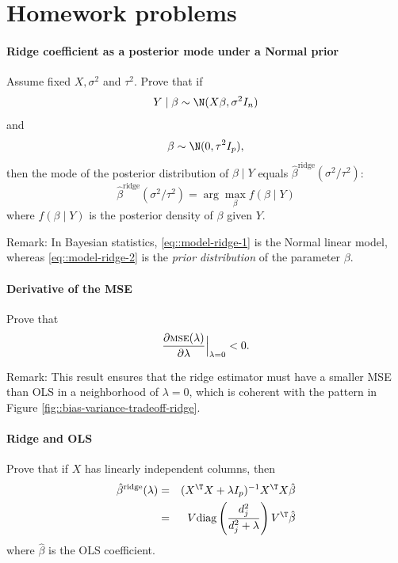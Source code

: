  


\section{Homework problems}

\paragraph{Ridge coefficient as a posterior mode under a Normal prior}\label{hw13::ridge-bayes}

Assume fixed $X, \sigma^2$ and $\tau^2$. 
Prove that if
\begin{equation}
\label{eq::model-ridge-1}
Y \mid \beta \sim\N(X\beta,\sigma^{2} I_n )
\end{equation}
and
\begin{equation}
\label{eq::model-ridge-2}
\beta\sim\N(0,\tau^{2}I_{p}),
\end{equation}
then the mode of the posterior distribution of $\beta\mid Y$ equals $\hat{\beta}^{\text{ridge}}(\sigma^{2}/\tau^{2})$:
$$
\hat{\beta}^{\text{ridge}}(\sigma^{2}/\tau^{2}) = \arg \max_{\beta} f(  \beta\mid Y  )
$$
where $f(\beta\mid Y)$ is the posterior density of $\beta$ given $Y$. 


Remark: In Bayesian statistics, \eqref{eq::model-ridge-1} is the Normal linear model, whereas \eqref{eq::model-ridge-2} is the {\it prior distribution} of the parameter $\beta$. 




\paragraph{Derivative of the MSE}\label{hw13::derivative-of-mse}

Prove that 
$$
\frac{\partial\textsc{mse}(\lambda)}{\partial\lambda} \Big |_{\lambda = 0} <0 .
$$

Remark: This result ensures that the ridge estimator must have a smaller MSE than OLS in a neighborhood of $\lambda = 0$, which is coherent with the pattern in Figure \ref{fig::bias-variance-tradeoff-ridge}. 



\paragraph{Ridge and OLS}\label{hw13::ridge-ols}


Prove that if  $X$ has linearly independent columns, then
\begin{eqnarray*}
\hat{\beta}^{\text{ridge}}(\lambda) 
&=& (X^{\T} X + \lambda I_p)^{-1} X^{\T} X \hat{\beta} \\
&=& V\text{diag}\left(    \frac{  d_j^2 }{  d_j^2 + \lambda   }  \right) V^{\T}  \hat{\beta}
\end{eqnarray*}
where $\hat{\beta}$ is the OLS coefficient.


